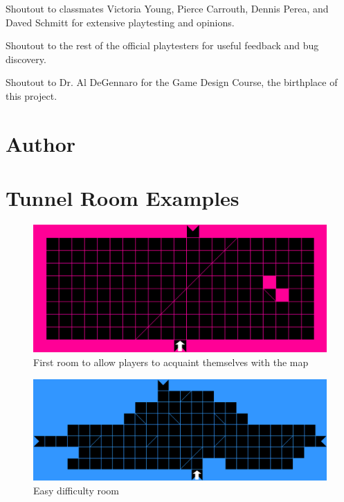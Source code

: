 \documentclass{scrreprt}
\begin{document}
		Shoutout to classmates Victoria Young, Pierce Carrouth, Dennis Perea, and Daved Schmitt for extensive playtesting and opinions. 
		
		Shoutout to the rest of the official playtesters for useful feedback and bug discovery.
		
		Shoutout to Dr. Al DeGennaro for the Game Design Course, the birthplace of this project.
		
	\chapter{Author}
	
	\appendix
	
	\chapter{Tunnel Room Examples}\label{chp:rooms}
		\begin{figure}[!ht]
			\centering
			\includegraphics[width=\columnwidth]{start}
			\caption{First room to allow players to acquaint themselves with the map}
			\label{fig:start}
		\end{figure}
	
		\begin{figure}[!ht]
			\centering
			\includegraphics[width=\columnwidth]{easy}
			\caption{Easy difficulty room}
			\label{fig:easy}
		\end{figure}
	
\end{document}
